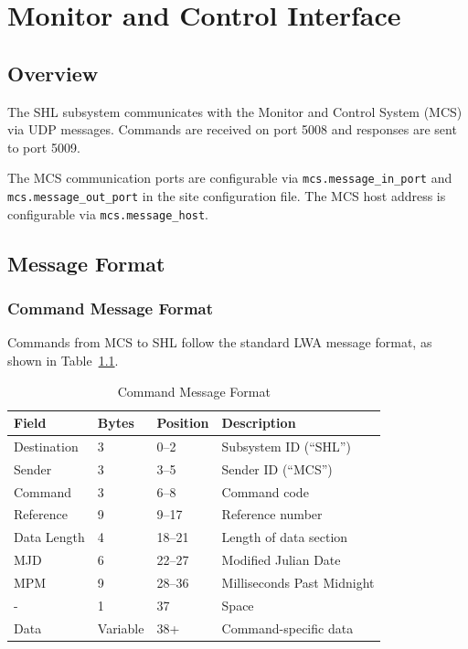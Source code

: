 
\chapter{Monitor and Control Interface}
\label{sec:monitor-control}

\section{Overview}

The SHL subsystem communicates with the Monitor and Control System (MCS) via UDP messages. Commands are received on port 5008 and responses are sent to port 5009.

\begin{siteNote}
The MCS communication ports are configurable via \texttt{mcs.message\_in\_port} and \texttt{mcs.message\_out\_port} in the site configuration file. The MCS host address is configurable via \texttt{mcs.message\_host}.
\end{siteNote}

\section{Message Format}

\subsection{Command Message Format}

Commands from MCS to SHL follow the standard LWA message format, as shown in Table~\ref{tab:cmd-format}.

\begin{table}[htbp]
    \centering
    \caption{Command Message Format}
    \label{tab:cmd-format}
    \begin{tabular}{llll}
        \toprule
        \textbf{Field} & \textbf{Bytes} & \textbf{Position} & \textbf{Description} \\
        \midrule
        Destination & 3 & 0--2 & Subsystem ID (``SHL'') \\
        Sender & 3 & 3--5 & Sender ID (``MCS'') \\
        Command & 3 & 6--8 & Command code \\
        Reference & 9 & 9--17 & Reference number \\
        Data Length & 4 & 18--21 & Length of data section \\
        MJD & 6 & 22--27 & Modified Julian Date \\
        MPM & 9 & 28--36 & Milliseconds Past Midnight \\
        - & 1 & 37 & Space \\
        Data & Variable & 38+ & Command-specific data \\
        \bottomrule
    \end{tabular}
\end{table}

